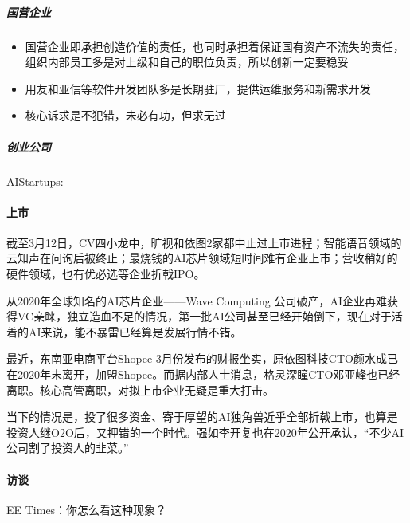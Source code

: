 \documentclass[letterpaper,10pt,english]{sphinxmanual}
\begin{document}
\subparagraph{国营企业}
\label{\detokenize{chapter_project/AI_industry_analysis:id24}}\begin{itemize}
\item {} 
国营企业即承担创造价值的责任，也同时承担着保证国有资产不流失的责任，组织内部员工多是对上级和自己的职位负责，所以创新一定要稳妥

\item {} 
用友和亚信等软件开发团队多是长期驻厂，提供运维服务和新需求开发

\item {} 
核心诉求是不犯错，未必有功，但求无过

\end{itemize}


\subparagraph{创业公司}
\label{\detokenize{chapter_project/AI_industry_analysis:id25}}
AIStartups: 


\paragraph{上市}
\label{\detokenize{chapter_project/AI_industry_analysis:id26}}
截至3月12日，CV四小龙中，旷视和依图2家都中止过上市进程；智能语音领域的云知声在问询后被终止；最烧钱的AI芯片领域短时间难有企业上市；营收稍好的硬件领域，也有优必选等企业折戟IPO。


从2020年全球知名的AI芯片企业——Wave Computing
公司破产，AI企业再难获得VC亲睐，独立造血不足的情况，第一批AI公司甚至已经开始倒下，现在对于活着的AI来说，能不暴雷已经算是发展行情不错。

最近，东南亚电商平台Shopee
3月份发布的财报坐实，原依图科技CTO颜水成已在2020年末离开，加盟Shopee。而据内部人士消息，格灵深瞳CTO邓亚峰也已经离职。核心高管离职，对拟上市企业无疑是重大打击。

当下的情况是，投了很多资金、寄于厚望的AI独角兽近乎全部折戟上市，也算是投资人继O2O后，又押错的一个时代。强如李开复也在2020年公开承认，“不少AI公司割了投资人的韭菜。”


\paragraph{访谈}
\label{\detokenize{chapter_project/AI_industry_analysis:id27}}
EE
Times：你怎么看这种现象？%
\begin{footnote}[721]\sphinxAtStartFootnote
{}
%
\end{footnote}
\end{document}

